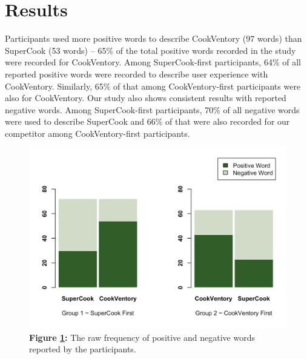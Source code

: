 \documentclass{sigchi}
\begin{document}
\section{Results}\label{results}
	Participants used more positive words to describe CookVentory (97 words) than SuperCook (53 words) -- 65\% of the total positive words recorded in the study were recorded for CookVentory. Among SuperCook-first participants, 64\% of all reported positive words were recorded to describe user experience with CookVentory. Similarly, 65\% of that among CookVentory-first participants were also for CookVentory. Our study also shows consistent results with reported negative words. Among SuperCook-first participants, 70\% of all negative words were used to describe SuperCook and 66\% of that were also recorded for our competitor among CookVentory-first participants. 

\begin{figure}[htb!]
\centering
	\includegraphics[width=0.8\columnwidth]{bar2.png}\\
	\textbf{Figure \ref{fig:bargraph}:} The raw frequency of positive and negative words reported by the participants.
	\label{fig:bargraph}
\end{figure}
\end{document}
